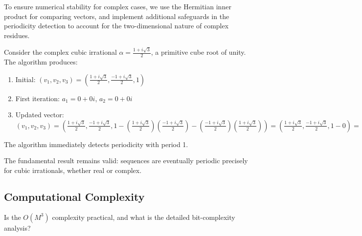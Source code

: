 \begin{response}
To ensure numerical stability for complex cases, we use the Hermitian inner product for comparing vectors, and implement additional safeguards in the periodicity detection to account for the two-dimensional nature of complex residues.

\begin{example}
Consider the complex cubic irrational $\alpha = \frac{1 + i\sqrt{3}}{2}$, a primitive cube root of unity. The algorithm produces:
\begin{enumerate}
\item Initial: $(v_1, v_2, v_3) = (\frac{1 + i\sqrt{3}}{2}, \frac{-1 + i\sqrt{3}}{2}, 1)$
\item First iteration: $a_1 = 0 + 0i$, $a_2 = 0 + 0i$
\item Updated vector: $(v_1, v_2, v_3) = (\frac{1 + i\sqrt{3}}{2}, \frac{-1 + i\sqrt{3}}{2}, 1 - (\frac{1 + i\sqrt{3}}{2})(\frac{-1 + i\sqrt{3}}{2}) - (\frac{-1 + i\sqrt{3}}{2})(\frac{1 + i\sqrt{3}}{2})) = (\frac{1 + i\sqrt{3}}{2}, \frac{-1 + i\sqrt{3}}{2}, 1 - 0) = (\frac{1 + i\sqrt{3}}{2}, \frac{-1 + i\sqrt{3}}{2}, 1)$
\end{enumerate}
The algorithm immediately detects periodicity with period 1.
\end{example}

The fundamental result remains valid: sequences are eventually periodic precisely for cubic irrationals, whether real or complex.
\end{response}

\subsection{Computational Complexity}

\begin{objection}
Is the $O(M^3)$ complexity practical, and what is the detailed bit-complexity analysis?
\end{objection}

